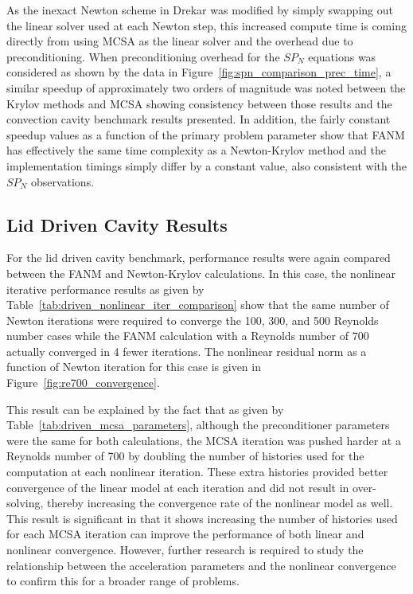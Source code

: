 As the inexact Newton scheme in Drekar was modified by simply swapping
out the linear solver used at each Newton step, this increased compute
time is coming directly from using MCSA as the linear solver and the
overhead due to preconditioning. When preconditioning overhead for the
$SP_N$ equations was considered as shown by the data in
Figure~\ref{fig:spn_comparison_prec_time}, a similar speedup of
approximately two orders of magnitude was noted between the Krylov
methods and MCSA showing consistency between those results and the
convection cavity benchmark results presented. In addition, the fairly
constant speedup values as a function of the primary problem parameter
show that FANM has effectively the same time complexity as a
Newton-Krylov method and the implementation timings simply differ by a
constant value, also consistent with the $SP_N$ observations.

\subsection{Lid Driven Cavity Results}
\label{subsec:lid_driven_comparison}

For the lid driven cavity benchmark, performance results were again
compared between the FANM and Newton-Krylov calculations. In this
case, the nonlinear iterative performance results as given by
Table~\ref{tab:driven_nonlinear_iter_comparison} show that the same
number of Newton iterations were required to converge the 100, 300,
and 500 Reynolds number cases while the FANM calculation with a
Reynolds number of 700 actually converged in 4 fewer iterations. The
nonlinear residual norm as a function of Newton iteration for this
case is given in Figure~\ref{fig:re700_convergence}.

This result can be explained by the fact that as given by
Table~\ref{tab:driven_mcsa_parameters}, although the preconditioner
parameters were the same for both calculations, the MCSA iteration was
pushed harder at a Reynolds number of 700 by doubling the number of
histories used for the computation at each nonlinear iteration. These
extra histories provided better convergence of the linear model at
each iteration and did not result in over-solving, thereby increasing
the convergence rate of the nonlinear model as well. This result is
significant in that it shows increasing the number of histories used
for each MCSA iteration can improve the performance of both linear and
nonlinear convergence. However, further research is required to study
the relationship between the acceleration parameters and the nonlinear
convergence to confirm this for a broader range of problems.

